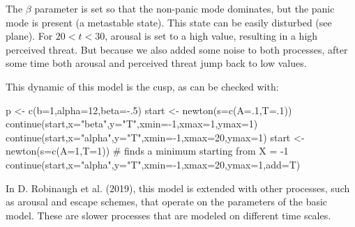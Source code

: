\documentclass[
  a4paper,
  DIV=11,
  numbers=noendperiod]{scrreprt}
\newenvironment{Shaded}{\begin{snugshade}}{\end{snugshade}}
\newcommand{\AttributeTok}[1]{\textcolor[rgb]{0.40,0.45,0.13}{#1}}
\newcommand{\CommentTok}[1]{\textcolor[rgb]{0.37,0.37,0.37}{#1}}
\newcommand{\DecValTok}[1]{\textcolor[rgb]{0.68,0.00,0.00}{#1}}
\newcommand{\FunctionTok}[1]{\textcolor[rgb]{0.28,0.35,0.67}{#1}}
\newcommand{\NormalTok}[1]{\textcolor[rgb]{0.00,0.23,0.31}{#1}}
\newcommand{\OtherTok}[1]{\textcolor[rgb]{0.00,0.23,0.31}{#1}}
\newcommand{\SpecialCharTok}[1]{\textcolor[rgb]{0.37,0.37,0.37}{#1}}
\newcommand{\StringTok}[1]{\textcolor[rgb]{0.13,0.47,0.30}{#1}}
\begin{document}
The \(\beta\) parameter is set so that the non-panic mode dominates, but
the panic mode is present (a metastable state). This state can be easily
disturbed (see plane). For \(20 < t < 30\), arousal is set to a high
value, resulting in a high perceived threat. But because we also added
some noise to both processes, after some time both arousal and perceived
threat jump back to low values.

This dynamic of this model is the cusp, as can be checked with:

\begin{Shaded}
\begin{Highlighting}[]
\NormalTok{p }\OtherTok{\textless{}{-}} \FunctionTok{c}\NormalTok{(}\AttributeTok{b=}\DecValTok{1}\NormalTok{,}\AttributeTok{alpha=}\DecValTok{12}\NormalTok{,}\AttributeTok{beta=}\SpecialCharTok{{-}}\NormalTok{.}\DecValTok{5}\NormalTok{)}
\NormalTok{start }\OtherTok{\textless{}{-}} \FunctionTok{newton}\NormalTok{(}\AttributeTok{s=}\FunctionTok{c}\NormalTok{(}\AttributeTok{A=}\NormalTok{.}\DecValTok{1}\NormalTok{,}\AttributeTok{T=}\NormalTok{.}\DecValTok{1}\NormalTok{)) }
\FunctionTok{continue}\NormalTok{(start,}\AttributeTok{x=}\StringTok{"beta"}\NormalTok{,}\AttributeTok{y=}\StringTok{"T"}\NormalTok{,}\AttributeTok{xmin=}\SpecialCharTok{{-}}\DecValTok{1}\NormalTok{,}\AttributeTok{xmax=}\DecValTok{1}\NormalTok{,}\AttributeTok{ymax=}\DecValTok{1}\NormalTok{) }
\FunctionTok{continue}\NormalTok{(start,}\AttributeTok{x=}\StringTok{"alpha"}\NormalTok{,}\AttributeTok{y=}\StringTok{"T"}\NormalTok{,}\AttributeTok{xmin=}\SpecialCharTok{{-}}\DecValTok{1}\NormalTok{,}\AttributeTok{xmax=}\DecValTok{20}\NormalTok{,}\AttributeTok{ymax=}\DecValTok{1}\NormalTok{) }
\NormalTok{start }\OtherTok{\textless{}{-}} \FunctionTok{newton}\NormalTok{(}\AttributeTok{s=}\FunctionTok{c}\NormalTok{(}\AttributeTok{A=}\DecValTok{1}\NormalTok{,}\AttributeTok{T=}\DecValTok{1}\NormalTok{)) }\CommentTok{\# finds a minimum starting from X = {-}1}
\FunctionTok{continue}\NormalTok{(start,}\AttributeTok{x=}\StringTok{"alpha"}\NormalTok{,}\AttributeTok{y=}\StringTok{"T"}\NormalTok{,}\AttributeTok{xmin=}\SpecialCharTok{{-}}\DecValTok{1}\NormalTok{,}\AttributeTok{xmax=}\DecValTok{20}\NormalTok{,}\AttributeTok{ymax=}\DecValTok{1}\NormalTok{,}\AttributeTok{add=}\NormalTok{T) }
\end{Highlighting}
\end{Shaded}

In D. Robinaugh et al. (2019), this model is extended with other
processes, such as arousal and escape schemes, that operate on the
parameters of the basic model. These are slower processes that are
modeled on different time scales.
\end{document}
